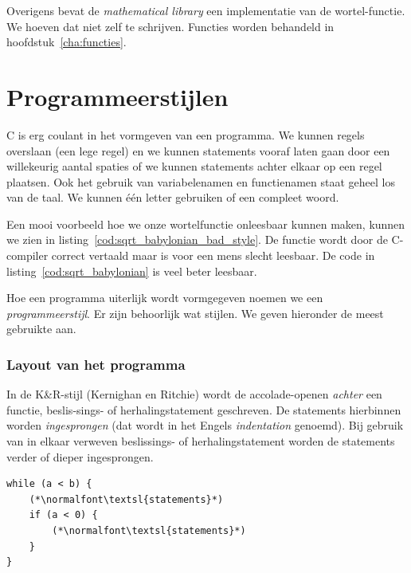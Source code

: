 Overigens bevat de \textsl{mathematical library} een implementatie van de wortel-functie. We hoeven dat niet zelf te schrijven. Functies worden behandeld in hoofdstuk~\ref{cha:functies}.


\section{Programmeerstijlen}
C is erg coulant in het vormgeven van een programma.
We kunnen regels overslaan (een lege regel) en we kunnen statements vooraf laten gaan door een willekeurig aantal spaties of we kunnen statements achter elkaar op een regel plaatsen.
Ook het gebruik van variabelenamen en functienamen staat geheel los van de taal. We kunnen één letter gebruiken of een compleet woord.

Een mooi voorbeeld hoe we onze wortelfunctie onleesbaar kunnen maken, kunnen we zien in listing~\ref{cod:sqrt_babylonian_bad_style}. De functie wordt door de C-compiler correct vertaald maar is voor een mens slecht leesbaar. De code in listing~\ref{cod:sqrt_babylonian} is veel beter leesbaar.


Hoe een programma uiterlijk wordt vormgegeven noemen we een \textsl{programmeerstijl}. Er zijn behoorlijk wat stijlen. We geven hieronder de meest gebruikte aan.

\subsubsection*{Layout van het programma}
In de K\&R-stijl (Kernighan en Ritchie) wordt de accolade-openen \textsl{achter} een functie, beslis-sings- of herhalingstatement geschreven. De statements hierbinnen worden \textsl{ingesprongen} (dat wordt in het Engels \textsl{indentation} genoemd). Bij gebruik van in elkaar verweven beslissings- of herhalingstatement worden de statements verder of dieper ingesprongen. 
\begin{lstlisting}[caption=K\&R-stijl.]
while (a < b) {
    (*\normalfont\textsl{statements}*)
    if (a < 0) {
        (*\normalfont\textsl{statements}*)
    }
}
\end{lstlisting}

